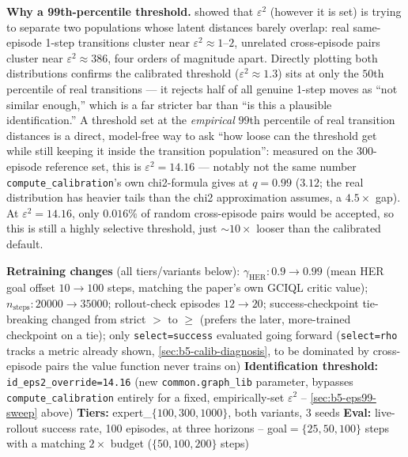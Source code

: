 \documentclass[11pt]{article}
\begin{document}
\textbf{Why a 99th-percentile threshold.}  showed that
$\varepsilon^2$ (however it is set) is trying to separate two populations whose latent
distances barely overlap: real same-episode 1-step transitions cluster near $\varepsilon^2
\approx 1$--$2$, unrelated cross-episode pairs cluster near $\varepsilon^2 \approx 386$, four
orders of magnitude apart. Directly plotting both distributions confirms the calibrated
threshold ($\varepsilon^2{\approx}1.3$) sits at only the $50$th percentile of real transitions
--- it rejects half of all genuine 1-step moves as ``not similar enough,'' which is a far
stricter bar than ``is this a plausible identification.'' A threshold set at the
\emph{empirical} $99$th percentile of real transition distances is a direct, model-free way to
ask ``how loose can the threshold get while still keeping it inside the transition
population'': measured on the $300$-episode reference set, this is $\varepsilon^2 = 14.16$
--- notably not the same number \texttt{compute\_calibration}'s own chi2-formula gives at
$q=0.99$ ($3.12$; the real distribution has heavier tails than the chi2 approximation assumes,
a $4.5\times$ gap). At $\varepsilon^2=14.16$, only $0.016\%$ of random cross-episode pairs
would be accepted, so this is still a highly selective threshold, just $\sim\!10\times$ looser
than the calibrated default.

\begin{algorithm}[H]
\caption{Methodology: retraining setup and the $99$th-percentile threshold experiment}
\begin{algorithmic}[1]
\State \textbf{Retraining changes} (all tiers/variants below): $\gamma_{\text{HER}}: 0.9 \to
0.99$ (mean HER goal offset $10 \to 100$ steps, matching the paper's own GCIQL critic value);
$n_{\text{steps}}: 20000 \to 35000$; rollout-check episodes $12 \to 20$; success-checkpoint
tie-breaking changed from strict $>$ to $\ge$ (prefers the later, more-trained checkpoint on a
tie); only \texttt{select=success} evaluated going forward (\texttt{select=rho} tracks a
metric already shown, \cref{sec:b5-calib-diagnosis}, to be dominated by cross-episode pairs the
value function never trains on)
\State \textbf{Identification threshold:} \texttt{id\_eps2\_override=14.16} (new
\texttt{common.graph\_lib} parameter, bypasses \texttt{compute\_calibration} entirely for a
fixed, empirically-set $\varepsilon^2$ -- \cref{sec:b5-eps99-sweep} above)
\State \textbf{Tiers:} expert\_$\{100, 300, 1000\}$, both variants, 3 seeds
\State \textbf{Eval:} live-rollout success rate, 100 episodes, at three horizons --
goal$=\{25,50,100\}$ steps with a matching $2\times$ budget ($\{50,100,200\}$ steps)
\end{algorithmic}
\end{algorithm}
\end{document}
